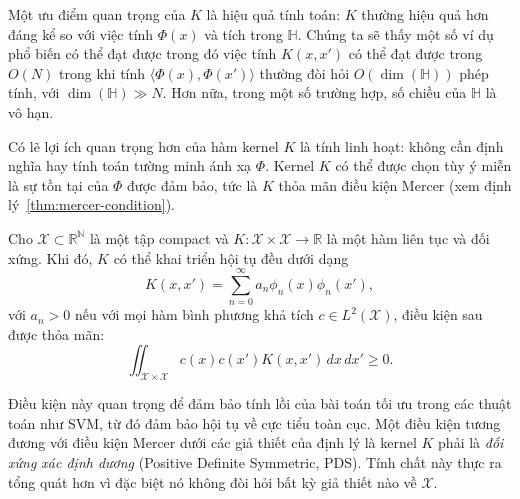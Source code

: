 Một ưu điểm quan trọng của  $K$ là hiệu quả tính toán: $K$ thường
hiệu quả hơn đáng kể so với việc tính $\Phi(x)$ và tích trong $\mathbb{H}$.
Chúng ta sẽ thấy một số ví dụ phổ biến có thể đạt được trong đó việc tính
$K(x, x')$ có thể đạt được trong $O(N)$ trong khi tính
$\bigl\langle \Phi(x), \Phi(x') \bigr\rangle$ thường đòi hỏi
$O(\dim(\mathbb{H}))$ phép tính, với $\dim(\mathbb{H}) \gg N$. Hơn nữa,
trong một số trường hợp, số chiều của $\mathbb{H}$ là vô hạn.

Có lẽ lợi ích quan trọng hơn của hàm kernel $K$ là tính linh hoạt: không cần
định nghĩa hay tính toán tường minh ánh xạ $\Phi$. Kernel $K$ có thể được chọn
tùy ý miễn là sự tồn tại của $\Phi$ được đảm bảo, tức là $K$ thỏa mãn điều
kiện Mercer (xem định lý~\ref{thm:mercer-condition}).

\begin{thm}
  \label{thm:mercer-condition}
  Cho $\mathcal{X} \subset \mathbb{R^N}$ là một tập compact và $K \colon
  \mathcal{X} \times \mathcal{X} \to \mathbb{R}$ là một hàm liên tục và đối
  xứng. Khi đó, $K$ có thể khai triển hội tụ đều dưới dạng
  \begin{equation}
    K(x, x') = \sum_{n=0}^{\infty} a_n \phi_n(x)\phi_n(x'),
  \end{equation}
  với $a_n > 0$ nếu với mọi hàm bình phương khả tích $c \in
  L^2(\mathcal{X})$, điều kiện sau được thỏa mãn:
  \begin{equation}
    \iint_{\mathcal{X} \times \mathcal{X}} c(x)c(x')K(x,x')\,dx\,dx' \geq 0.
  \end{equation}
\end{thm}
Điều kiện này quan trọng để đảm bảo tính lồi của bài toán tối ưu trong các
thuật toán như SVM, từ đó đảm bảo hội tụ về cực tiểu toàn cục. Một điều kiện
tương đương với điều kiện Mercer dưới các giả thiết của định lý là kernel $K$
phải là \textit{ đối xứng xác định dương}
(Positive Definite Symmetric, PDS). Tính chất này thực ra tổng quát hơn vì
đặc biệt nó không đòi hỏi bất kỳ giả thiết nào về $\mathcal{X}$.
